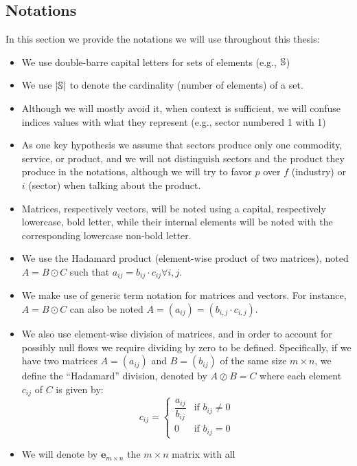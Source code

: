 \subsection{Notations}
\label{sec:notations}

In this section we
provide the notations we will use throughout this thesis:

\begin{itemize}
\item We use double-barre capital letters for sets of elements (e.g., $\mathbb{S}$)
\item We use $|\mathbb{S}|$ to denote the cardinality (number of elements) of a
  set.
\item Although we will mostly avoid it, when context is sufficient, we will
  confuse indices values with what they represent (e.g., sector numbered 1 with
  1)
\item As one key hypothesis we assume that sectors produce only one
  commodity, service, or product, and we will not distinguish sectors
  and the product they produce in the notations, although we will try to favor
  $p$ over $f$ (industry) or $i$ (sector) when talking about the product.
\item Matrices, respectively vectors, will be noted using a capital,
  respectively lowercase, bold letter, while their internal elements will be
  noted with the corresponding lowercase non-bold letter.
\item We use the Hadamard product (element-wise product of two matrices), noted $A = B
  \odot C$ such that $a_{ij} = b_{ij} \cdot c_{ij} \forall i,j$.
\item We make use of generic term notation for matrices and vectors. For
  instance, $A = B \odot C$ can also be noted $A = (a_{ij}) = (b_{i,j} \cdot
  c_{i,j})$.
\item We also use element-wise division of matrices, and in order to account for
  possibly null flows we require dividing by zero to be defined. Specifically,
  if we have two matrices $A = (a_{ij})$ and $B = (b_{ij})$ of
  the same size $m \times n$, we define the ``Hadamard'' division, denoted by $A
  \oslash B = C$ where each element $c_{ij}$ of $C$ is given by:
  \[
  c_{ij} =
  \begin{cases}
    \dfrac{a_{ij}}{b_{ij}} & \text{if } b_{ij} \neq 0\\
                             0 & \text{if } b_{ij} = 0
  \end{cases}
  \]
\item We will denote by $\bm{e}_{m \times n}$ the $m \times n$ matrix with all

\end{itemize}
